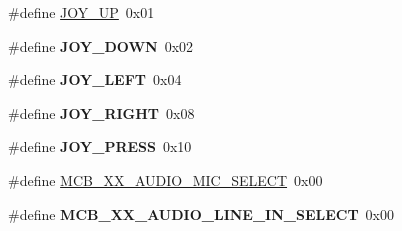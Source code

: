 \begin{DoxyCompactItemize}
\item 
\#define \hyperlink{group___b_o_a_r_d___n_x_p___l_p_c_x_p_r_e_s_s_o__1769_ga85e47af11e6a32e3a819f247d9f619d6}{J\+O\+Y\+\_\+\+U\+P}~0x01
\item 
\hypertarget{group___b_o_a_r_d___n_x_p___l_p_c_x_p_r_e_s_s_o__1769_ga950e3ba6cd65c992b92f36b837c52a0a}{\#define {\bfseries J\+O\+Y\+\_\+\+D\+O\+W\+N}~0x02}\label{group___b_o_a_r_d___n_x_p___l_p_c_x_p_r_e_s_s_o__1769_ga950e3ba6cd65c992b92f36b837c52a0a}

\item 
\hypertarget{group___b_o_a_r_d___n_x_p___l_p_c_x_p_r_e_s_s_o__1769_ga5b41c548ba97989b473f6393b9c2c7f1}{\#define {\bfseries J\+O\+Y\+\_\+\+L\+E\+F\+T}~0x04}\label{group___b_o_a_r_d___n_x_p___l_p_c_x_p_r_e_s_s_o__1769_ga5b41c548ba97989b473f6393b9c2c7f1}

\item 
\hypertarget{group___b_o_a_r_d___n_x_p___l_p_c_x_p_r_e_s_s_o__1769_ga59c1b2e5c6856ed044ba0635102fd995}{\#define {\bfseries J\+O\+Y\+\_\+\+R\+I\+G\+H\+T}~0x08}\label{group___b_o_a_r_d___n_x_p___l_p_c_x_p_r_e_s_s_o__1769_ga59c1b2e5c6856ed044ba0635102fd995}

\item 
\hypertarget{group___b_o_a_r_d___n_x_p___l_p_c_x_p_r_e_s_s_o__1769_ga08968e3964995337594242759b10a988}{\#define {\bfseries J\+O\+Y\+\_\+\+P\+R\+E\+S\+S}~0x10}\label{group___b_o_a_r_d___n_x_p___l_p_c_x_p_r_e_s_s_o__1769_ga08968e3964995337594242759b10a988}

\item 
\#define \hyperlink{group___b_o_a_r_d___n_x_p___l_p_c_x_p_r_e_s_s_o__1769_gac737c1dea0127d28b40c9ddcba5cb6c0}{M\+C\+B\+\_\+X\+X\+\_\+\+A\+U\+D\+I\+O\+\_\+\+M\+I\+C\+\_\+\+S\+E\+L\+E\+C\+T}~0x00
\item 
\hypertarget{group___b_o_a_r_d___n_x_p___l_p_c_x_p_r_e_s_s_o__1769_ga82163b63569fbf0be48c9c250296d0c8}{\#define {\bfseries M\+C\+B\+\_\+X\+X\+\_\+\+A\+U\+D\+I\+O\+\_\+\+L\+I\+N\+E\+\_\+\+I\+N\+\_\+\+S\+E\+L\+E\+C\+T}~0x00}\label{group___b_o_a_r_d___n_x_p___l_p_c_x_p_r_e_s_s_o__1769_ga82163b63569fbf0be48c9c250296d0c8}

\end{DoxyCompactItemize}

